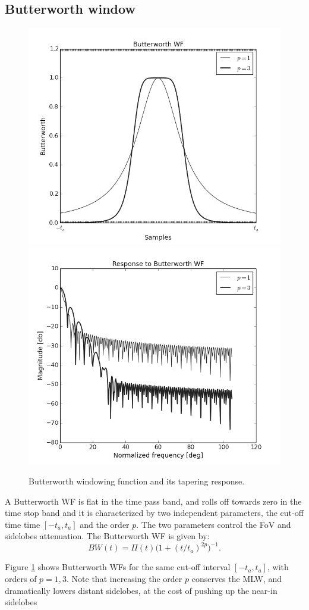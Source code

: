 \documentclass[useAMS,usenatbib]{mn2e}
\begin{document}
\subsection{Butterworth window}
\begin{figure}
\includegraphics[width=.5\textwidth]{./Figures/butterworthgrey.png}%
\includegraphics[width=.5\textwidth]{./Figures/freq_resp_butterworthgrey.png}
\caption{Butterworth windowing function and its tapering response.}\label{fig:wf:bw}
\end{figure}

A Butterworth WF is flat in the time pass band, and rolls off towards zero in the time stop band and it is 
characterized by two independent parameters, the cut-off time time $[-t_a,t_a]$ and the order $p$. 
The two parameters control the 
FoV and sidelobes attenuation. The Butterworth WF is given by:
\begin{equation}
BW(t)= \Pi(t) \Big(1 + (t/t_a)^{2p}\Big)^{-1}.
\end{equation}

Figure \ref{fig:wf:bw} shows Butterworth WFs for the same cut-off interval $[-t_a,t_a]$, with orders of $p=1,3$. Note that increasing 
the order $p$ conserves the MLW, and dramatically lowers distant sidelobes, at the cost of pushing up the near-in sidelobes
\end{document}

